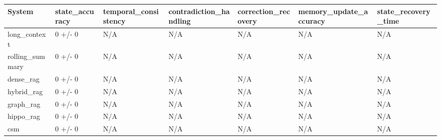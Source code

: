 \begin{tabular}{lllllll}
System & state_accuracy & temporal_consistency & contradiction_handling & correction_recovery & memory_update_accuracy & state_recovery_time \\
\hline
long\_context & 0 +/- 0 & N/A & N/A & N/A & N/A & N/A \\
rolling\_summary & 0 +/- 0 & N/A & N/A & N/A & N/A & N/A \\
dense\_rag & 0 +/- 0 & N/A & N/A & N/A & N/A & N/A \\
hybrid\_rag & 0 +/- 0 & N/A & N/A & N/A & N/A & N/A \\
graph\_rag & 0 +/- 0 & N/A & N/A & N/A & N/A & N/A \\
hippo\_rag & 0 +/- 0 & N/A & N/A & N/A & N/A & N/A \\
csm & 0 +/- 0 & N/A & N/A & N/A & N/A & N/A \\
\end{tabular}
